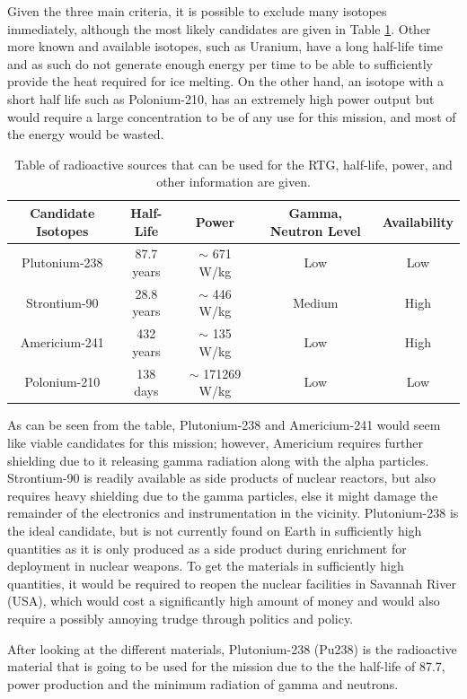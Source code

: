 Given the three main criteria, it is possible to exclude many isotopes immediately, although the most likely candidates are given in Table \ref{tab:isotopes}. Other more known and available isotopes, such as Uranium, have a long half-life time and as such do not generate enough energy per time to be able to sufficiently provide the heat required for ice melting. On the other hand, an isotope with a short half life such as Polonium-210, has an extremely high power output but would require a large concentration to be of any use for this mission, and most of the energy would be wasted.

\begin{table}[h!]
	\begin{tabular}{c|c|c|c|c}
		Candidate Isotopes & Half-Life & Power & Gamma, Neutron Level & Availability\\
		\hline
		Plutonium-238 & 87.7 years & $\sim$ 671 W/kg & Low & Low\\
		Strontium-90 & 28.8 years & $\sim$ 446 W/kg & Medium & High\\
		Americium-241 & 432 years & $\sim$ 135 W/kg & Low & High\\
		Polonium-210 & 138 days & $\sim$ 171269 W/kg & Low & Low\\
	\end{tabular}
	\caption{Table of radioactive sources that can be used for the RTG, half-life, power, and other information are given. \label{tab:isotopes}}
\end{table}

As can be seen from the table, Plutonium-238 and Americium-241 would seem like viable candidates for this mission; however, Americium requires further shielding due to it releasing gamma radiation along with the alpha particles. Strontium-90 is readily available as side products of nuclear reactors, but also requires heavy shielding due to the gamma particles, else it might damage the remainder of the electronics and instrumentation in the vicinity. Plutonium-238 is the ideal candidate, but is not currently found on Earth in sufficiently high quantities as it is only produced as a side product during enrichment for deployment in nuclear weapons. To get the materials in sufficiently high quantities, it would be required to reopen the nuclear facilities in Savannah River (USA), which would cost a significantly high amount of money and would also require a possibly annoying trudge through politics and policy.

\label{sec:plutonium}
After looking at the different materials, Plutonium-238 (Pu238) is the radioactive material that is going to be used for the mission due to the the half-life of 87.7, power production and the minimum radiation of gamma and neutrons. \\

